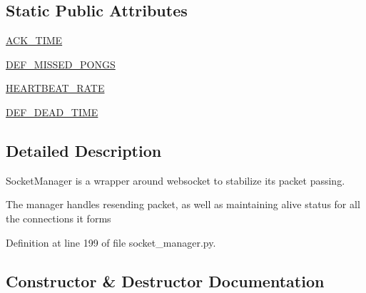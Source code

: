 \subsection*{Static Public Attributes}
\begin{DoxyCompactItemize}
\item 
\hyperlink{classparlai_1_1mturk_1_1core_1_1legacy__2018_1_1socket__manager_1_1SocketManager_ab9e91e6d31b0a8cbee08a69cd5d54c99}{A\+C\+K\+\_\+\+T\+I\+ME}
\item 
\hyperlink{classparlai_1_1mturk_1_1core_1_1legacy__2018_1_1socket__manager_1_1SocketManager_a0f241edfe6db02a1d9b5c0a54b7d1447}{D\+E\+F\+\_\+\+M\+I\+S\+S\+E\+D\+\_\+\+P\+O\+N\+GS}
\item 
\hyperlink{classparlai_1_1mturk_1_1core_1_1legacy__2018_1_1socket__manager_1_1SocketManager_afa855d56173d233a1dc79bb2eebc6307}{H\+E\+A\+R\+T\+B\+E\+A\+T\+\_\+\+R\+A\+TE}
\item 
\hyperlink{classparlai_1_1mturk_1_1core_1_1legacy__2018_1_1socket__manager_1_1SocketManager_a95f11e1f710c96100b9edaf289604b79}{D\+E\+F\+\_\+\+D\+E\+A\+D\+\_\+\+T\+I\+ME}
\end{DoxyCompactItemize}


\subsection{Detailed Description}
\begin{DoxyVerb}SocketManager is a wrapper around websocket to stabilize its packet passing.

The manager handles resending packet, as well as maintaining alive status for all
the connections it forms
\end{DoxyVerb}
 

Definition at line 199 of file socket\+\_\+manager.\+py.



\subsection{Constructor \& Destructor Documentation}
\mbox{\label{classparlai_1_1mturk_1_1core_1_1legacy__2018_1_1socket__manager_1_1SocketManager_ac4a8060782edd077f684e1f90a04f75d}} 
